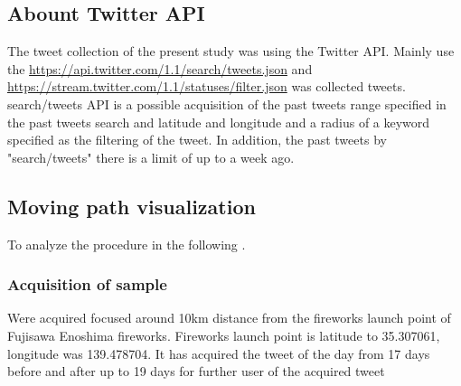 \subsection{Abount Twitter API}
The tweet collection of the present study was using the Twitter API. Mainly use the \url{https://api.twitter.com/1.1/search/tweets.json} and \url{https://stream.twitter.com/1.1/statuses/filter.json} was collected tweets. search/tweets API is a possible acquisition of the past tweets range specified in the past tweets search and latitude and longitude and a radius of a keyword specified as the filtering of the tweet. In addition, the past tweets by "search/tweets" there is a limit of up to a week ago.

\subsection{Moving  path visualization}
To analyze the procedure in the following .

\subsubsection{Acquisition of sample}
Were acquired focused around 10km distance from the fireworks launch point of Fujisawa Enoshima fireworks. Fireworks launch point is latitude to 35.307061, longitude was 139.478704. It has acquired the tweet of the day from 17 days before and after up to 19 days for further user of the acquired tweet

